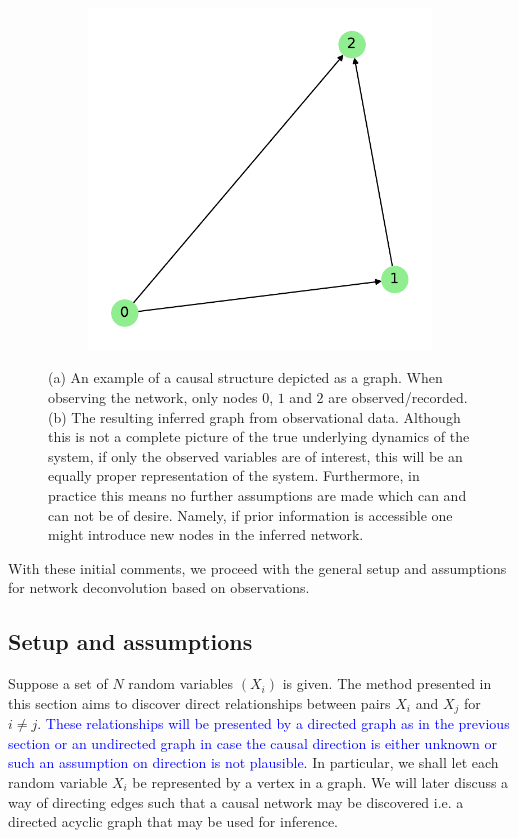 \documentclass[../Thesis.tex]{subfiles}
\begin{document}
\begin{figure}[h]
\begin{subfigure}[t]{0.49\textwidth}
        \includegraphics[width=\linewidth]{figures/ND examples/Hidden nodes/graph example wo hidden.pdf}
        \caption{}
        \label{subfig:hidden nodes example resulting graph}
    \end{subfigure}
    \caption{(a) An example of a causal structure depicted as a graph. When observing the network, only nodes $0$, $1$ and $2$ are observed/recorded. (b) The resulting inferred graph from observational data. Although this is not a complete picture of the true underlying dynamics of the system, if only the observed variables are of interest, this will be an equally proper representation of the system. Furthermore, in practice this means no further assumptions are made which can and can not be of desire. Namely, if prior information is accessible one might introduce new nodes in the inferred network.}
    \label{fig:hidden nodes example}
\end{figure}
With these initial comments, we proceed with the general setup and assumptions for network deconvolution based on observations.

\subsection{Setup and assumptions}\label{subsec:Setup and assumptions}
Suppose a set of $N$ random variables $(X_i)$ is given. The method presented in this section aims to discover direct relationships between pairs $X_i$ and $X_j$ for $i\neq j$. \textcolor{blue}{These relationships will be presented by a directed graph as in the previous section or an undirected graph in case the causal direction is either unknown or such an assumption on direction is not plausible}. In particular, we shall let each random variable $X_i$ be represented by a vertex in a graph. We will later discuss a way of directing edges such that a causal network may be discovered i.e. a directed acyclic graph that may be used for inference.
\end{document}
